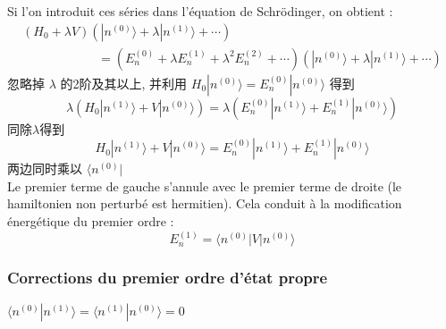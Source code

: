 Si l'on introduit ces s\'eries dans l'\'equation de Schr\"odinger, on obtient :
$$
\begin{matrix}
\left(H_0 + \lambda V \right) \left(|n^{(0)}\rangle + \lambda |n^{(1)}\rangle + \cdots \right) \qquad\qquad\qquad\qquad\\
\qquad\qquad\qquad= \left(E_n^{(0)} + \lambda E_n^{(1)} + \lambda^2 E_n^{(2)} + \cdots \right) \left(|n^{(0)}\rangle + \lambda |n^{(1)}\rangle + \cdots \right)
\end{matrix}
$$
忽略掉 $\lambda$ 的2阶及其以上, 并利用
$H_0 |n^{(0)}\rangle = E_n^{(0)} |n^{(0)}\rangle$
得到
$$ \lambda(H_0 |n^{(1)}\rangle + V |n^{(0)}\rangle) = \lambda(E_n^{(0)} |n^{(1)}\rangle + E_n^{(1)} |n^{(0)}\rangle) $$
同除$\lambda$得到
\begin{equation}
H_0 |n^{(1)}\rangle + V |n^{(0)}\rangle = E_n^{(0)} |n^{(1)}\rangle + E_n^{(1)} |n^{(0)}\rangle
\label{eq.approximation.perturbation.ordre.1}
\end{equation}
两边同时乘以 $\scriptstyle \langle n^{(0)}|$\\
Le premier terme de gauche s'annule avec le premier terme de droite (le hamiltonien non perturb\'e est hermitien). Cela conduit \`a la modification \'energ\'etique du premier ordre :
\begin{equation}
E_n^{(1)} = \langle n^{(0)} | V | n^{(0)} \rangle
\end{equation}

\subsubsection{Corrections du premier ordre d'\'etat propre}
$\langle n^{(0)}| n^{(1)}\rangle  = \langle n^{(1)}|n^{(0)}\rangle = 0$

